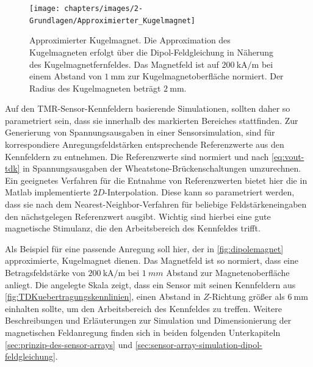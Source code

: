 \vspace{5mm}
\begin{figure}[tph]
	\centering
	\texttt{[image: chapters/images/2-Grundlagen/Approximierter\_Kugelmagnet]}
	\caption[Approximierter Kugelmagnet]{Approximierter Kugelmagnet. Die Approximation des Kugelmagneten erfolgt 
		über die Dipol-Feldgleichung in Näherung des Kugelmagnetfernfeldes. Das Magnetfeld ist auf 
		$\SI{200}{\kilo\ampere\per\metre}$ bei einem Abstand von $\SI{1}{\milli\metre}$ zur Kugelmagnetoberfläche 
		normiert. Der Radius des Kugelmagneten beträgt $\SI{2}{\milli\metre}$.}
	\label{fig:dipolemagnet}
\end{figure}


Auf den TMR-Sensor-Kennfeldern basierende Simulationen, sollten daher so parametriert sein, dass sie innerhalb des markierten Bereiches stattfinden. Zur Generierung von Spannungsausgaben in einer Sensorsimulation, sind für korrespondiere Anregungsfeldstärken entsprechende Referenzwerte aus den Kennfeldern zu entnehmen. Die  Referenzwerte sind normiert und nach \autoref{eq:vout-tdk} in Spannungsausgaben der Wheatstone-Brückenschaltungen umzurechnen. Ein geeignetes Verfahren für die Entnahme von Referenzwerten bietet hier die in Matlab implementierte $2D$-Interpolation. Diese kann so parametriert werden, dass sie nach dem Nearest-Neighbor-Verfahren für beliebige Feldstärkeneingaben den nächstgelegen Referenzwert ausgibt. Wichtig sind hierbei eine gute magnetische Stimulanz, die den Arbeitsbereich des Kennfeldes trifft.


\clearpage


Als Beispiel für eine passende Anregung soll hier, der in \autoref{fig:dipolemagnet} approximierte, Kugelmagnet dienen. Das Magnetfeld ist so normiert, dass eine Betragsfeldstärke von $\SI{200}{\kilo\ampere\per\metre}$ bei $\SI{1}{mm}$ Abstand zur Magnetenoberfläche anliegt. Die angelegte Skala zeigt, dass ein Sensor mit seinen Kennfeldern aus \autoref{fig:TDKuebertragungskennlinien}, einen Abstand in $Z$-Richtung größer als $\SI{6}{\milli\metre}$ einhalten sollte, um den Arbeitsbereich des Kennfeldes zu treffen. Weitere Beschreibungen und Erläuterungen zur Simulation und Dimensionierung der magnetischen Feldanregung finden sich in beiden folgenden Unterkapiteln \autoref{sec:prinzip-des-sensor-arrays} und \autoref{sec:sensor-array-simulation-dipol-feldgleichung}.



